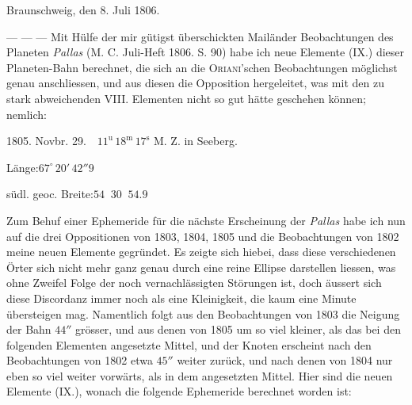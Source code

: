\begin{flushright}
Braunschweig, den 8. Juli 1806.
\end{flushright}

\par\indent --- --- --- Mit Hülfe der mir gütigst überschickten Mailänder Beobachtungen des Planeten
\emph{Pallas} (M. C. Juli-Heft 1806. S. 90) habe ich neue Elemente (IX.) dieser Planeten-Bahn berechnet, die
sich an die \textsc{Oriani}'schen Beobachtungen möglichst genau anschliessen, und aus diesen die Opposition
hergeleitet, was mit den zu stark abweichenden VIII. Elementen nicht so gut hätte geschehen können;
nemlich:

\begin{center}
1805. Novbr. 29.\ \ $11^{\mathrm{u}}\,18^{\mathrm{m}}\,17^{\mathrm{s}}$ M. Z. in Seeberg.

Länge:\quad $67^\circ\,20'\,42''9$

südl. geoc. Breite:\quad $54\;\;30\;\;54.9$
\end{center}

\par\indent Zum Behuf einer Ephemeride für die nächste Erscheinung der \emph{Pallas} habe ich nun auf die drei
Oppositionen von 1803, 1804, 1805 und die Beobachtungen von 1802 meine neuen Elemente gegründet.
Es zeigte sich hiebei, dass diese verschiedenen Örter sich nicht mehr ganz genau durch eine reine Ellipse darstellen liessen, was ohne Zweifel Folge der noch vernachlässigten Störungen ist, doch äussert
sich diese Discordanz immer noch als eine Kleinigkeit, die kaum eine Minute übersteigen mag. Namentlich
folgt aus den Beobachtungen von 1803 die Neigung der Bahn $44''$ grösser, und aus denen von 1805 um
so viel kleiner, als das bei den folgenden Elementen angesetzte Mittel, und der Knoten erscheint nach
den Beobachtungen von 1802 etwa $45''$ weiter zurück, und nach denen von 1804 nur eben so viel weiter
vorwärts, als in dem angesetzten Mittel. Hier sind die neuen Elemente (IX.), wonach die folgende Ephemeride berechnet worden ist:

